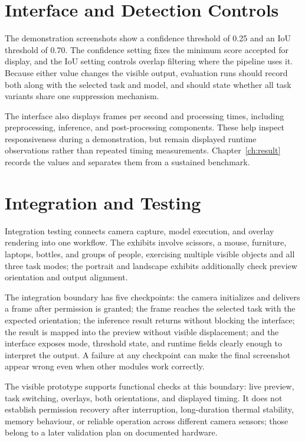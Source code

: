 \section{Interface and Detection Controls}\label{sec:controls}
The demonstration screenshots show a confidence threshold of 0.25 and an IoU threshold of 0.70. The
confidence setting fixes the minimum score accepted for display, and the IoU setting controls overlap
filtering where the pipeline uses it. Because either value changes the visible output, evaluation runs
should record both along with the selected task and model, and should state whether all task variants
share one suppression mechanism.

The interface also displays frames per second and processing times, including preprocessing, inference,
and post-processing components. These help inspect responsiveness during a demonstration, but remain
displayed runtime observations rather than repeated timing measurements. Chapter~\ref{ch:result}
records the values and separates them from a sustained benchmark.

\label{end:controls}
\section{Integration and Testing}\label{sec:integration}
Integration testing connects camera capture, model execution, and overlay rendering into one
workflow. The exhibits involve scissors, a mouse, furniture, laptops, bottles, and groups of people,
exercising multiple visible objects and all three task modes; the portrait and landscape exhibits
additionally check preview orientation and output alignment.

The integration boundary has five checkpoints: the camera initializes and delivers a frame after
permission is granted; the frame reaches the selected task with the expected orientation; the
inference result returns without blocking the interface; the result is mapped into the preview
without visible displacement; and the interface exposes mode, threshold state, and runtime fields
clearly enough to interpret the output. A failure at any checkpoint can make the final screenshot
appear wrong even when other modules work correctly.

The visible prototype supports functional checks at this boundary: live preview, task switching,
overlays, both orientations, and displayed timing. It does not establish permission recovery after
interruption, long-duration thermal stability, memory behaviour, or reliable operation across
different camera sensors; those belong to a later validation plan on documented hardware.

